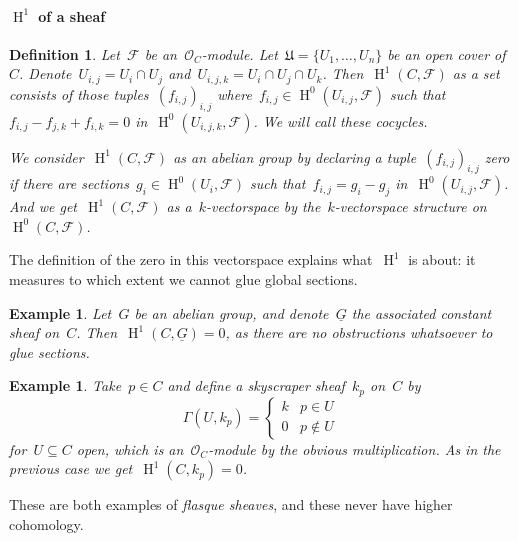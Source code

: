 \documentclass[10pt,a4paper]{article}
\theoremstyle{lecture}
\newtheorem{definition}[theorem]{Definition}
\newtheorem{example}[theorem]{Example}
\newcommand\dash{\nobreakdash-\hspace{0pt}}
\DeclareMathOperator\HH{H}
\begin{document}
\paragraph{$\HH^1$ of a sheaf}
\begin{definition}
  Let~$\mathcal{F}$ be an~$\mathcal{O}_C$\dash module. Let~$\mathfrak{U}=\{U_1,\dotsc,U_n\}$ be an open cover of~$C$. Denote~$U_{i,j}=U_i\cap U_j$ and~$U_{i,j,k}=U_i\cap U_j\cap U_k$. Then~$\HH^1(C,\mathcal{F})$ \emph{as a set} consists of those tuples~$(f_{i,j})_{i,j}$ where~$f_{i,j}\in\HH^0(U_{i,j},\mathcal{F})$ such that~$f_{i,j}-f_{j,k}+f_{i,k}=0$ in~$\HH^0(U_{i,j,k},\mathcal{F})$. We will call these \emph{cocycles}.

  We consider~$\HH^1(C,\mathcal{F})$ \emph{as an abelian group} by declaring a tuple~$(f_{i,j})_{i,j}$ zero if there are sections~$g_i\in\HH^0(U_i,\mathcal{F})$ such that~$f_{i,j}=g_i-g_j$ in~$\HH^0(U_{i,j},\mathcal{F})$. And we get~$\HH^1(C,\mathcal{F})$ \emph{as a~$k$\dash vectorspace} by the~$k$\dash vectorspace structure on~$\HH^0(C,\mathcal{F})$.
\end{definition}
The definition of the zero in this vectorspace explains what~$\HH^1$ is about: it measures to which extent we cannot glue global sections.
\begin{example}
  Let~$G$ be an abelian group, and denote~$\underline{G}$ the associated constant sheaf on~$C$. Then~$\HH^1(C,\underline{G})=0$, as there are no obstructions whatsoever to glue sections.
\end{example}
\begin{example}
  Take~$p\in C$ and define a \emph{skyscraper sheaf}~$k_p$ on~$C$ by
  \begin{equation}
    \Gamma(U,k_p)=
    \begin{cases}
      k & p\in U \\
      0 & p\notin U
    \end{cases}
  \end{equation}
  for~$U\subseteq C$ open, which is an~$\mathcal{O}_C$\dash module by the obvious multiplication. As in the previous case we get~$\HH^1(C,k_p)=0$.
\end{example}
These are both examples of \emph{flasque sheaves}, and these never have higher cohomology.
\end{document}
